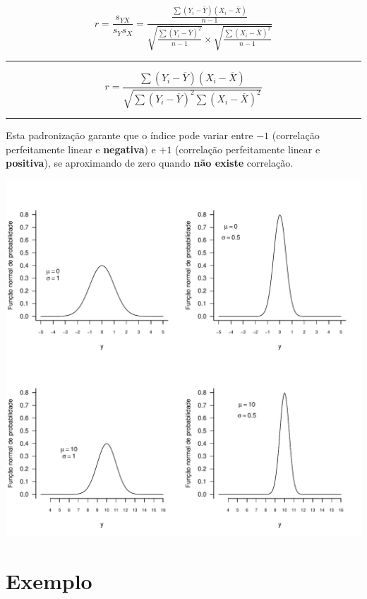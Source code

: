 \documentclass[
]{book}
\begin{document}
\[r = \frac{s_{YX}}{s_Y s_X} = 
\frac{\frac{\sum{(Y_i - \overline{Y})(X_i - \overline{X})}}{n-1}}
{\sqrt{\frac{\sum{(Y_i - \overline{Y})^2}}{n-1}}  \times 
\sqrt{\frac{\sum{(X_i - \overline{X})^2}}{n-1}}}\]

\begin{center}\rule{0.5\linewidth}{0.5pt}\end{center}

\[r = \frac{\sum{(Y_i - \overline{Y})(X_i - \overline{X})}}{\sqrt{\sum{(Y_i - \overline{Y})^2 \sum{(X_i - \overline{X})^2}}}}\]

\begin{center}\rule{0.5\linewidth}{0.5pt}\end{center}

Esta padronização garante que o índice pode variar entre \(-1\) (correlação perfeitamente linear e \textbf{negativa}) e \(+1\) (correlação perfeitamente linear e \textbf{positiva}), se aproximando de zero quando \textbf{não existe} correlação.

\begin{center}\includegraphics{probest-cambientais_files/figure-latex/unnamed-chunk-204-1} \end{center}

\hypertarget{exemplo}{%
\section{Exemplo}\label{exemplo}}
\end{document}
